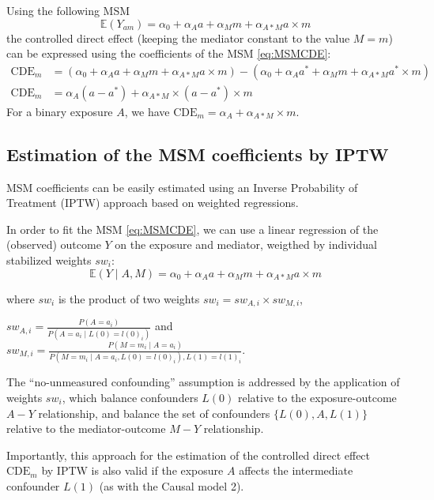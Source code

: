 \documentclass[
]{book}
\begin{document}
Using the following MSM
\begin{equation} 
  \mathbb{E}(Y_{am}) = \alpha_0 + \alpha_A a + \alpha_M m + \alpha_{A \ast M} a \times m
  \label{eq:MSMCDE}
\end{equation}
the controlled direct effect (keeping the mediator constant to the value \(M=m\)) can be expressed using the coefficients of the MSM \eqref{eq:MSMCDE}:
\begin{align*} 
  \text{CDE}_m &= (\alpha_0 + \alpha_A a + \alpha_M m + \alpha_{A \ast M} a \times m) - (\alpha_0 + \alpha_A a^* + \alpha_M m + \alpha_{A \ast M} a^* \times m) \\
  \text{CDE}_m &= \alpha_A(a - a^* ) + \alpha_{A \ast M} \times (a - a^*) \times m
\end{align*}
For a binary exposure \(A\), we have \(\text{CDE}_m=\alpha_A + \alpha_{A \ast M} \times m\).

\hypertarget{estimation-of-the-msm-coefficients-by-iptw-1}{%
\subsection{Estimation of the MSM coefficients by IPTW}\label{estimation-of-the-msm-coefficients-by-iptw-1}}

MSM coefficients can be easily estimated using an Inverse Probability of Treatment (IPTW) approach based on weighted regressions.

In order to fit the MSM \eqref{eq:MSMCDE}, we can use a linear regression of the (observed) outcome \(Y\) on the exposure and mediator, weigthed by individual stabilized weights \(sw_i\):
\begin{equation} 
  \mathbb{E}\left(Y \mid A,M\right) = \alpha_0 + \alpha_A a + \alpha_M m + \alpha_{A \ast M} a \times m
\end{equation}

where \(sw_i\) is the product of two weights \(sw_i = sw_{A,i} \times sw_{M,i}\),

\(sw_{A,i}=\frac{P(A=a_i)}{P(A=a_i \mid L(0)=l(0)_i)}\) and \(sw_{M,i}=\frac{P(M=m_i \mid A=a_i)}{P(M = m_i \mid A=a_i,L(0)=l(0)_i), L(1)=l(1)_i}\).

The ``no-unmeasured confounding'' assumption is addressed by the application of weights \(sw_i\), which balance confounders \(L(0)\) relative to the exposure-outcome \(A-Y\) relationship, and balance the set of confounders \(\{L(0),A,L(1)\}\) relative to the mediator-outcome \(M-Y\) relationship.

Importantly, this approach for the estimation of the controlled direct effect \(\text{CDE}_m\) by IPTW is also valid if the exposure \(A\) affects the intermediate confounder \(L(1)\) (as with the Causal model 2).
\end{document}
